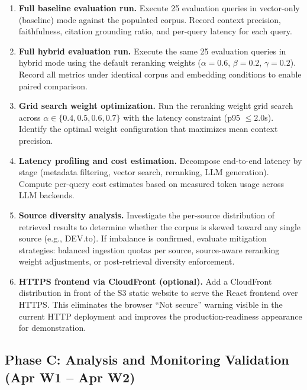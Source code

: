 \documentclass[12pt,a4paper]{report}
\begin{document}
\begin{enumerate}[leftmargin=0.5in, resume]
  \item \textbf{Full baseline evaluation run.} Execute 25 evaluation queries in vector-only (baseline) mode against the populated corpus. Record context precision, faithfulness, citation grounding ratio, and per-query latency for each query.

  \item \textbf{Full hybrid evaluation run.} Execute the same 25 evaluation queries in hybrid mode using the default reranking weights ($\alpha = 0.6$, $\beta = 0.2$, $\gamma = 0.2$). Record all metrics under identical corpus and embedding conditions to enable paired comparison.

  \item \textbf{Grid search weight optimization.} Run the reranking weight grid search across $\alpha \in \{0.4, 0.5, 0.6, 0.7\}$ with the latency constraint (p95 $\leq 2.0$s). Identify the optimal weight configuration that maximizes mean context precision.

  \item \textbf{Latency profiling and cost estimation.} Decompose end-to-end latency by stage (metadata filtering, vector search, reranking, LLM generation). Compute per-query cost estimates based on measured token usage across LLM backends.

  \item \textbf{Source diversity analysis.} Investigate the per-source distribution of retrieved results to determine whether the corpus is skewed toward any single source (e.g., DEV.to). If imbalance is confirmed, evaluate mitigation strategies: balanced ingestion quotas per source, source-aware reranking weight adjustments, or post-retrieval diversity enforcement.

  \item \textbf{HTTPS frontend via CloudFront (optional).} Add a CloudFront distribution in front of the S3 static website to serve the React frontend over HTTPS. This eliminates the browser ``Not secure'' warning visible in the current HTTP deployment and improves the production-readiness appearance for demonstration.
\end{enumerate}

\subsection{Phase C: Analysis and Monitoring Validation (Apr W1 -- Apr W2)}
\end{document}

